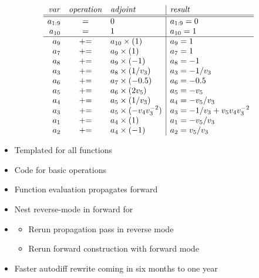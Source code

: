 \documentclass[10pt]{report}
\begin{document}
{\small
\[
\begin{array}{rcl|l}
{\it var} & {\it operation} & {\it adjoint} & {\it result}
\\ \hline \hline
a_{1:9} & = & 0 & a_{1:9} = 0
\\
a_{10} & = & 1 & a_{10} = 1
\\ \hline
a_{9} & {+}{=} & a_{10} \times (1) & a_9 = 1
\\
a_{7} & {+}{=} & a_9 \times (1) & a_7 = 1
\\
a_{8} & {+}{=} & a_9 \times (-1) & a_8 = -1
\\
a_{3} & {+}{=} & a_8 \times (1 / v_3) & a_3 = -1 / v_3
\\
a_{6} & {+}{=} & a_7 \times (-0.5) & a_6 = -0.5
\\
a_{5} & {+}{=} & a_6 \times (2 v_5) & a_5 = -v_5
\\
a_{4} & {+}{=} & a_5 \times (1 / v_3) & a_4 = -v_5 / v_3
\\
a_{3} & {+}{=} & a_5 \times (-v_4 v_3^{-2}) & a_3 = -1 / v_3 + v_5 v_4 v_3^{-2}
\\
a_{1} & {+}{=} & a_4 \times (1) & a_1 = -v_5 / v_3
\\
a_{2} & {+}{=} & a_4 \times (-1) & a_2 = v_5 / v_3
\end{array}
\]
}

\begin{itemize}
\item Templated  for all functions
\item Code  for basic operations
\item Function evaluation propagates  forward
\item Nest reverse-mode in forward for 
\item {}
  \vspace*{-4pt}
  \begin{itemize}\small
  \item Rerun propagation pass in reverse mode
  \item Rerun forward construction with forward mode
  \end{itemize}
  \vfill
\item Faster autodiff rewrite coming in six months to one year
\end{itemize}

\end{document}
